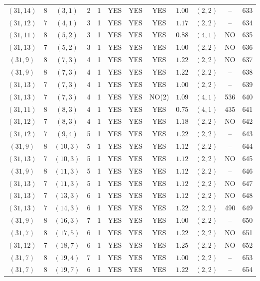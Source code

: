 \begin{longtable}{|c|c|c|c|c|c|c|c|c|c|c|c|}
$(31,14)$ & 8 & $(3,1)$ & 2 & 1 & YES & YES & YES & $1.00$ & $(2,2)$ & -- & 633\\
$(31,12)$ & 7 & $(4,1)$ & 3 & 1 & YES & YES & YES & $1.17$ & $(2,2)$ & -- & 634\\
$(31,11)$ & 8 & $(5,2)$ & 3 & 1 & YES & YES & YES & $0.88$ & $(4,1)$ & NO & 635\\
$(31,13)$ & 7 & $(5,2)$ & 3 & 1 & YES & YES & YES & $1.00$ & $(2,2)$ & NO & 636\\
$(31,9)$ & 8 & $(7,3)$ & 4 & 1 & YES & YES & YES & $1.22$ & $(2,2)$ & NO & 637\\
$(31,9)$ & 8 & $(7,3)$ & 4 & 1 & YES & YES & YES & $1.22$ & $(2,2)$ & -- & 638\\
$(31,13)$ & 7 & $(7,3)$ & 4 & 1 & YES & YES & YES & $1.00$ & $(2,2)$ & -- & 639\\
$(31,13)$ & 7 & $(7,3)$ & 4 & 1 & YES & YES & NO(2) & $1.09$ & $(4,1)$ & 536 & 640\\
$(31,11)$ & 8 & $(8,3)$ & 4 & 1 & YES & YES & YES & $0.75$ & $(4,1)$ & 435 & 641\\
$(31,12)$ & 7 & $(8,3)$ & 4 & 1 & YES & YES & YES & $1.18$ & $(2,2)$ & NO & 642\\
$(31,12)$ & 7 & $(9,4)$ & 5 & 1 & YES & YES & YES & $1.22$ & $(2,2)$ & -- & 643\\
$(31,9)$ & 8 & $(10,3)$ & 5 & 1 & YES & YES & YES & $1.12$ & $(2,2)$ & -- & 644\\
$(31,13)$ & 7 & $(10,3)$ & 5 & 1 & YES & YES & YES & $1.12$ & $(2,2)$ & NO & 645\\
$(31,9)$ & 8 & $(11,3)$ & 5 & 1 & YES & YES & YES & $1.12$ & $(2,2)$ & -- & 646\\
$(31,13)$ & 7 & $(11,3)$ & 5 & 1 & YES & YES & YES & $1.12$ & $(2,2)$ & NO & 647\\
$(31,13)$ & 7 & $(13,3)$ & 6 & 1 & YES & YES & YES & $1.12$ & $(2,2)$ & NO & 648\\
$(31,13)$ & 7 & $(14,3)$ & 6 & 1 & YES & YES & YES & $1.22$ & $(2,2)$ & 490 & 649\\
$(31,9)$ & 8 & $(16,3)$ & 7 & 1 & YES & YES & YES & $1.00$ & $(2,2)$ & -- & 650\\
$(31,7)$ & 8 & $(17,5)$ & 6 & 1 & YES & YES & YES & $1.22$ & $(2,2)$ & NO & 651\\
$(31,12)$ & 7 & $(18,7)$ & 6 & 1 & YES & YES & YES & $1.25$ & $(2,2)$ & NO & 652\\
$(31,7)$ & 8 & $(19,4)$ & 7 & 1 & YES & YES & YES & $1.00$ & $(2,2)$ & -- & 653\\
$(31,7)$ & 8 & $(19,7)$ & 6 & 1 & YES & YES & YES & $1.22$ & $(2,2)$ & -- & 654\\

\end{longtable}
